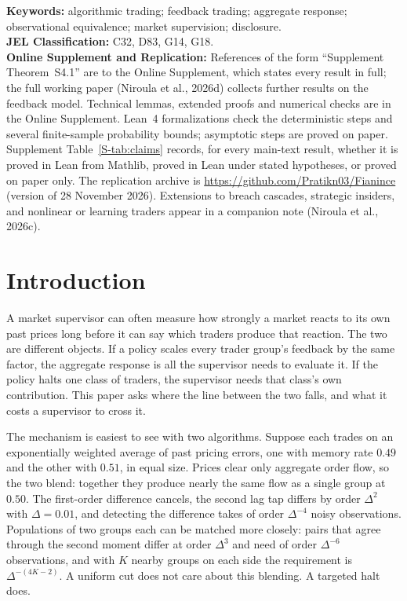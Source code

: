 \documentclass[11pt,letterpaper]{article}
\theoremstyle{definition}
\begin{document}
\vspace{0.5em}
\noindent\textbf{Keywords:} algorithmic trading; feedback trading; aggregate response; observational equivalence; market supervision; disclosure.\\
\noindent\textbf{JEL Classification:} C32, D83, G14, G18.\\
\noindent\textbf{Online Supplement and Replication:} References of the form ``Supplement Theorem~S4.1'' are to the Online Supplement, which states every result in full; the full working paper (Niroula et al., 2026d) collects further results on the feedback model. Technical lemmas, extended proofs and numerical checks are in the Online Supplement. Lean~4 formalizations check the deterministic steps and several finite-sample probability bounds; asymptotic steps are proved on paper. Supplement Table~\ref{S-tab:claims} records, for every main-text result, whether it is proved in Lean from Mathlib, proved in Lean under stated hypotheses, or proved on paper only. The replication archive is \url{https://github.com/Pratikn03/Fianince} (version of 28 November 2026). Extensions to breach cascades, strategic insiders, and nonlinear or learning traders appear in a companion note (Niroula et al., 2026c).

\newpage
\hypersetup{pageanchor=true}
\setcounter{page}{1}

\section{Introduction}

A market supervisor can often measure how strongly a market reacts to its own past prices long before it can say which traders produce that reaction. The two are different objects. If a policy scales every trader group's feedback by the same factor, the aggregate response is all the supervisor needs to evaluate it. If the policy halts one class of traders, the supervisor needs that class's own contribution. This paper asks where the line between the two falls, and what it costs a supervisor to cross it.

The mechanism is easiest to see with two algorithms. Suppose each trades on an exponentially weighted average of past pricing errors, one with memory rate $0.49$ and the other with $0.51$, in equal size. Prices clear only aggregate order flow, so the two blend: together they produce nearly the same flow as a single group at $0.50$. The first-order difference cancels, the second lag tap differs by order $\Delta^2$ with $\Delta = 0.01$, and detecting the difference takes of order $\Delta^{-4}$ noisy observations. Populations of two groups each can be matched more closely: pairs that agree through the second moment differ at order $\Delta^3$ and need of order $\Delta^{-6}$ observations, and with $K$ nearby groups on each side the requirement is $\Delta^{-(4K-2)}$. A uniform cut does not care about this blending. A targeted halt does.
\end{document}
